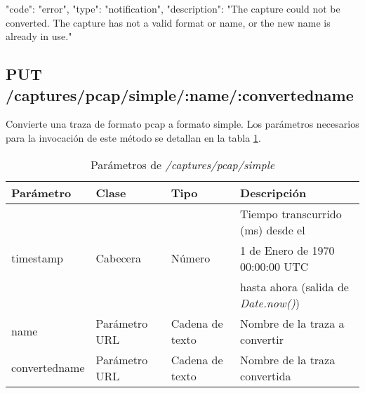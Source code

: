 \begin{itemize}
{\begin{minipage}{\textwidth}
\begin{code}[language=json]
{
  "code": "error",
  "type": "notification",
  "description": "The capture could not be converted. The capture has not a valid format or name, or the new name is already in use."
}
\end{code}
\end{minipage}
}
\end{itemize}

%
%
\subsection{PUT /captures/pcap/simple/:name/:convertedname}
Convierte una \gls{traza} de formato \gls{pcap} a formato \gls{simple}. Los parámetros necesarios para la invocación de este método se detallan en la tabla \ref{extra:api:capturespcapsimple:invocacion}.

\begin{table}[H]
\centering
\begin{tabular}{|l|l|l|l|}
\hline
\rowcolor[HTML]{F5F5F5}
\textbf{Parámetro}  & \textbf{Clase} & \textbf{Tipo}   & \textbf{Descripción}                        \\ \hline
                    &                &                 & Tiempo transcurrido (ms) desde el           \\
timestamp           & Cabecera       & Número          & 1 de Enero de 1970 00:00:00 UTC             \\
                    &                &                 & hasta ahora (salida de \textit{Date.now()}) \\ \hline
name                & Parámetro URL  & Cadena de texto & Nombre de la \gls{traza} a convertir        \\ \hline
convertedname       & Parámetro URL  & Cadena de texto & Nombre de la \gls{traza} convertida         \\ \hline
\end{tabular}
\caption{Parámetros de \textit{/captures/pcap/simple}}
\label{extra:api:capturespcapsimple:invocacion}
\end{table}

